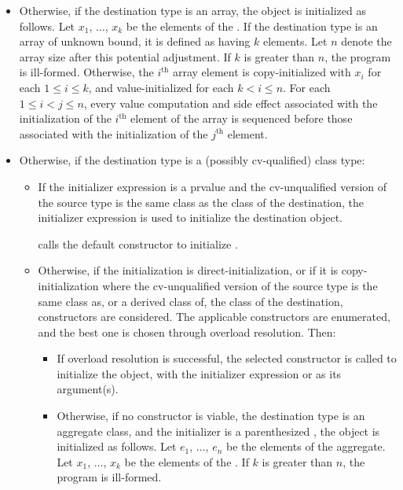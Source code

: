 \begin{itemize}
\item
Otherwise, if the destination type is an array,
the object is initialized as follows.
Let $x_1$, $\dotsc$, $x_k$ be
the elements of the .
If the destination type is an array of unknown bound,
it is defined as having $k$ elements.
Let $n$ denote the array size after this potential adjustment.
If $k$ is greater than $n$,
the program is ill-formed.
Otherwise, the $i^\text{th}$ array element is copy-initialized with
$x_i$ for each $1 \leq i \leq k$, and
value-initialized for each $k < i \leq n$.
For each $1 \leq i < j \leq n$,
every value computation and side effect associated with
the initialization of the $i^\text{th}$ element of the array
is sequenced before those associated with
the initialization of the $j^\text{th}$ element.
\item
Otherwise, if the destination type is a (possibly cv-qualified) class type:
\begin{itemize}
\item
If the initializer expression is a prvalue
and the cv-unqualified version of the source type
is the same class as the class of the destination,
the initializer expression is used to initialize the destination object.
\begin{example}
 calls the  default constructor to initialize .
\end{example}
\item
Otherwise, if the initialization is direct-initialization,
or if it is copy-initialization where the cv-unqualified version of the source
type is the same class as, or a derived class of, the class of the destination,
constructors are considered.
The applicable constructors
are enumerated, and the best one is chosen
through overload resolution. Then:
\begin{itemize}
\item
If overload resolution is successful,
the selected constructor
is called to initialize the object, with the initializer
expression or  as its argument(s).
\item
Otherwise, if no constructor is viable,
the destination type is
an aggregate class, and
the initializer is a parenthesized ,
the object is initialized as follows.
Let $e_1$, $\dotsc$, $e_n$ be the elements of the aggregate.
Let $x_1$, $\dotsc$, $x_k$ be the elements of the .
If $k$ is greater than $n$, the program is ill-formed.

\end{itemize}
\end{itemize}
\end{itemize}
